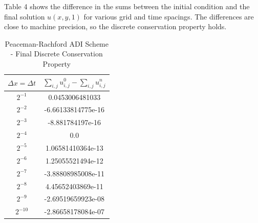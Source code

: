 \documentclass[12pt]{article}
\begin{document}
\begin{enumerate}[(a)]
Table 4 shows the difference in the sums between the initial condition and the final solution $u(x,y,1)$ for various grid and time spacings.  The differences are close to machine precision, so the discrete conservation property holds.
\begin{table}[H]
\caption{Peaceman-Rachford ADI Scheme - Final Discrete Conservation Property}
\centering\begin{tabular}{|cc|}
\hline \hline
   $\Delta x = \Delta t$ & $\sum_{i,j} u_{i,j}^0 - \sum_{i,j} u^n_{i,j}$  \\
\hline
                 $2^{-1}$  & 0.0453006481033    \\
                 $2^{-2}$  & -6.66133814775e-16 \\
                 $2^{-3}$  & -8.881784197e-16 \\
                 $2^{-4}$  & 0.0  \\
                 $2^{-5}$  & 1.06581410364e-13 \\
                 $2^{-6}$  & 1.25055521494e-12  \\
                 $2^{-7}$  & -3.88808985008e-11  \\
                 $2^{-8}$  & 4.45652403869e-11  \\
                 $2^{-9}$  & -2.69519659923e-08 \\
                 $2^{-10}$ & -2.86658178084e-07 \\
\hline \hline
\end{tabular}
\end{table}
\end{enumerate}
\end{document}
